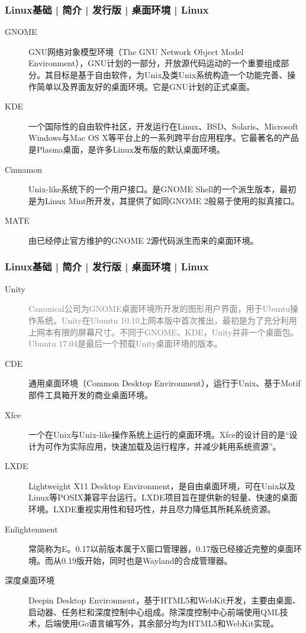 \begin{frame}
  \frametitle{Linux基础 | 简介 | 发行版 | 桌面环境 | Linux}
  \begin{description}
    \item[GNOME] GNU网络对象模型环境（The GNU Network Object Model Environment），GNU计划的一部分，开放源代码运动的一个重要组成部分。其目标是基于自由软件，为Unix及类Unix系统构造一个功能完善、操作简单以及界面友好的桌面环境。它是GNU计划的正式桌面。
    \item[KDE] 一个国际性的自由软件社区，开发运行在Linux、BSD、Solaris、Microsoft Windows与Mac OS X等平台上的一系列跨平台应用程序。它最著名的产品是Plasma桌面，是许多Linux发布版的默认桌面环境。
    \item[Cinnamon] Unix-like系统下的一个用户接口。是GNOME Shell的一个派生版本，最初是为Linux Mint所开发，其提供了如同GNOME 2般易于使用的拟真接口。
    \item[MATE] 由已经停止官方维护的GNOME 2源代码派生而来的桌面环境。
  \end{description}
\end{frame}

\begin{frame}
  \frametitle{Linux基础 | 简介 | 发行版 | 桌面环境 | Linux}
  {\footnotesize
  \begin{description}
    \item[Unity] \textcolor{gray}{Canonical公司为GNOME桌面环境所开发的图形用户界面，用于Ubuntu操作系统。Unity在Ubuntu 10.10上网本版中首次推出，最初是为了充分利用上网本有限的屏幕尺寸。不同于GNOME、KDE，Unity并非一个桌面包。Ubuntu 17.04是最后一个预载Unity桌面环境的版本。}
    \item[CDE] 通用桌面环境（Common Desktop Environment），运行于Unix、基于Motif部件工具箱开发的商业桌面环境。
    \item[Xfce] 一个在Unix与Unix-like操作系统上运行的桌面环境。Xfce的设计目的是“设计为可作为实际应用，快速加载及运行程序，并减少耗用系统资源”。
    \item[LXDE] Lightweight X11 Desktop Environment，是自由桌面环境，可在Unix以及Linux等POSIX兼容平台运行。LXDE项目旨在提供新的轻量、快速的桌面环境。LXDE重视实用性和轻巧性，并且尽力降低其所耗系统资源。
    \item[Enlightenment] 常简称为E。0.17以前版本属于X窗口管理器，0.17版已经接近完整的桌面环境。而从0.19版开始，同时也是Wayland的合成管理器。
    \item[深度桌面环境] Deepin Desktop Environment，基于HTML5和WebKit开发，主要由桌面、启动器、任务栏和深度控制中心组成。除深度控制中心前端使用QML技术，后端使用Go语言编写外，其余部分均为HTML5和WebKit实现。
  \end{description}
  }
\end{frame}

